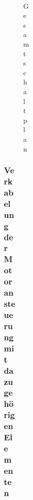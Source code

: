 \begin{figure}[H]
\begin{center}
\begin{figure}[H]
\begin{center}
\begin{figure}[H]
\begin{center}
\begin{figure}[H]
\begin{center}
\begin{figure}[H]
\begin{center}
\begin{figure}[H]
\begin{center}
\begin{figure}[H]
\begin{center}
\includegraphics[width=15cm]{Bilder/Schaltplan/Gesamtschaltplan}
\caption{Gesamtschaltplan}
\label{Gesamtschaltplan}

\end{center}
\end{figure}
\subsubsection{Verkabelung der Motoransteuerung mit dazugehörigen Elementen}
\begin{figure}[H] 

\begin{center}


\end{center}
\end{figure}
\end{center}
\end{figure}
\end{center}
\end{figure}
\end{center}
\end{figure}
\end{center}
\end{figure}
\end{center}
\end{figure}
\end{center}
\end{figure}
